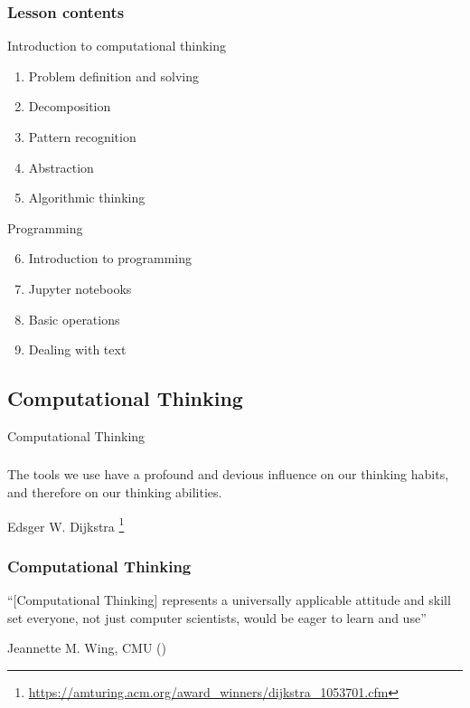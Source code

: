 \documentclass[xcolor=x11names,handout]{beamer}
\begin{document}
\begin{frame}
 \frametitle{Lesson contents}
\alert{Introduction to computational thinking}

\begin{enumerate}
 \item Problem definition and solving
 \item Decomposition
 \item Pattern recognition
 \item Abstraction
 \item Algorithmic thinking
\end{enumerate}
\bigskip 	\pause

\alert{Programming}
\begin{enumerate}\setcounter{enumi}{5}
 \item Introduction to programming
 \item Jupyter notebooks
 \item Basic operations
 \item Dealing with text
\end{enumerate}
\end{frame}


\begin{frame}
\section{Computational Thinking}
\centering
\alert{Computational Thinking}
\end{frame}





\begin{frame}
\frametitle{}
The tools we use have a profound and devious influence on our thinking habits,
and therefore on our thinking abilities.
\begin{flushright}
Edsger W. Dijkstra%
\footnote{\url{https://amturing.acm.org/award_winners/dijkstra_1053701.cfm}}
\end{flushright}
\end{frame}



\begin{frame}
\frametitle{Computational Thinking}
``[Computational Thinking] represents a universally applicable attitude and
skill set \alert{everyone}, not just computer scientists, would be eager to
learn and use''
\begin{flushright}
	Jeannette M. Wing, CMU (\citeyear{Wing2006})
\end{flushright}
\end{frame}
\end{document}
